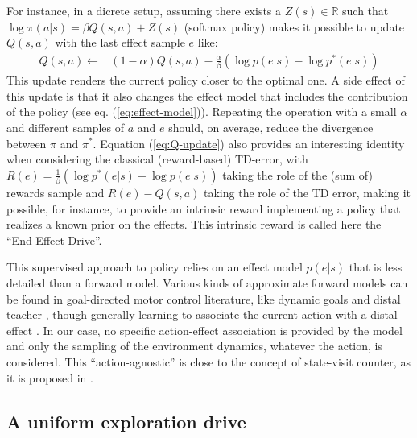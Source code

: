 \documentclass[runningheads]{llncs}
\begin{document}
For instance, in a dicrete setup, assuming there exists a $Z(s) \in \mathbb{R}$ such that $\log \pi(a|s) = \beta Q(s,a) + Z(s)$ (softmax policy) makes it possible to update $Q(s,a)$ with the last effect sample $e$ like:
\begin{align}\label{eq:Q-update}
Q(s,a) \leftarrow & (1-\alpha) Q(s,a) - \frac{\alpha}{\beta} (\log p(e|s) - \log p^*(e|s))
\end{align}  
This update renders the current policy closer to the optimal one. A side effect of this update is that it also changes the effect model that includes the contribution of the policy (see eq. (\ref{eq:effect-model})). Repeating the operation with a small $\alpha$ and different samples of $a$ and $e$ should, on average, reduce the divergence between $\pi$ and $\pi^*$.
Equation (\ref{eq:Q-update}) also provides an interesting identity when considering the classical (reward-based) TD-error, with $R(e) = \frac{1}{\beta} (\log p^*(e|s) - \log p(e|s))$ taking the role of the (sum of) rewards sample and $R(e) - Q(s,a)$ taking the role of the TD error,
making it possible, for instance, to provide an intrinsic reward implementing a policy that realizes a known prior on the effects. 
This intrinsic reward is called here the ``End-Effect Drive''.

This supervised approach to policy relies on an effect model $p(e|s)$ that is less detailed than a forward model. Various kinds of approximate forward models can be found in goal-directed motor control literature, like dynamic goals \cite{kaelbling1993learning} and distal teacher \cite{jordan1992forward}, though generally learning to associate the current action with a distal effect \cite{mishra2017prediction,kurutach2018model}. In our case, no specific action-effect association is provided by the model and only the sampling of the environment dynamics, whatever the action, is considered. This ``action-agnostic'' is close to the concept of state-visit counter, as it is proposed in \cite{bellemare2016unifying}.



\subsection{A uniform exploration drive}
\end{document}
